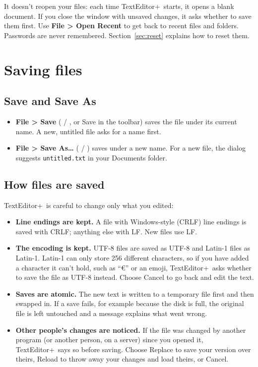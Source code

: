 \documentclass[11pt,a4paper]{article}
\newcommand{\appname}{TextEditor+}
\newcommand{\menu}[1]{\textsf{\textbf{#1}}}
\newcommand{\ui}[1]{\textsf{#1}}
\begin{document}
It doesn't reopen your files: each time \appname\ starts, it opens a blank
document. If you close the window with unsaved changes, it asks whether to
save them first. Use \menu{File > Open Recent} to get back to recent files
and folders. Passwords are never remembered. Section~\ref{sec:reset} explains how to reset them.

\section{Saving files}\label{sec:saving}

\subsection{Save and Save As}

\begin{itemize}
  \item \menu{File > Save} ( / , or \ui{Save} in the
        toolbar) saves the file under its current name. A new, untitled file
        asks for a name first.
  \item \menu{File > Save As…} ( / ) saves under a new
        name. For a new file, the dialog suggests \texttt{untitled.txt} in your
        Documents folder.
\end{itemize}

\subsection{How files are saved}

\appname\ is careful to change only what you edited:

\begin{itemize}
  \item \textbf{Line endings are kept.} A file with Windows-style (CRLF) line
        endings is saved with CRLF; anything else with LF. New files use LF.
  \item \textbf{The encoding is kept.} UTF-8 files are saved as UTF-8 and
        Latin-1 files as Latin-1. Latin-1 can only store 256 different
        characters, so if you have added a character it can't hold, such as
        ``€'' or an emoji, \appname\ asks whether to save the file as UTF-8
        instead. Choose \ui{Cancel} to go back and edit the text.
  \item \textbf{Saves are atomic.} The new text is written to a temporary file
        first and then swapped in. If a save fails, for example because the
        disk is full, the original file is left untouched and a message
        explains what went wrong.
  \item \textbf{Other people's changes are noticed.} If the file was changed
        by another program (or another person, on a server) since you opened
        it, \appname\ says so before saving. Choose \ui{Replace} to save your
        version over theirs, \ui{Reload} to throw away your changes and load
        theirs, or \ui{Cancel}.
\end{itemize}
\end{document}
